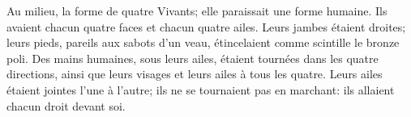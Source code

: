 Au milieu, la forme de quatre Vivants; elle paraissait une forme humaine.
Ils avaient chacun quatre faces et chacun quatre ailes.
Leurs jambes étaient droites;
	leurs pieds, pareils aux sabots d’un veau,
	étincelaient comme scintille le bronze poli.
Des mains humaines, sous leurs ailes, étaient tournées dans les quatre directions,
	ainsi que leurs visages et leurs ailes à tous les quatre.
Leurs ailes étaient jointes l’une à l’autre;
	ils ne se tournaient pas en marchant: ils allaient chacun droit devant soi.
